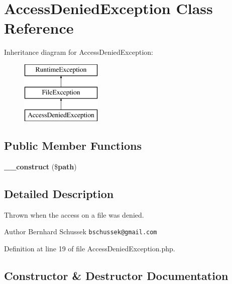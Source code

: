 \section{Access\+Denied\+Exception Class Reference}
\label{class_symfony_1_1_component_1_1_http_foundation_1_1_file_1_1_exception_1_1_access_denied_exception}
Inheritance diagram for Access\+Denied\+Exception\+:\begin{figure}[H]
\begin{center}
\leavevmode
\includegraphics[height=3.000000cm]{class_symfony_1_1_component_1_1_http_foundation_1_1_file_1_1_exception_1_1_access_denied_exception}
\end{center}
\end{figure}
\subsection*{Public Member Functions}
\begin{DoxyCompactItemize}
\item 
{\bf \+\_\+\+\_\+construct} (\${\bf path})
\end{DoxyCompactItemize}


\subsection{Detailed Description}
Thrown when the access on a file was denied.

\begin{DoxyAuthor}{Author}
Bernhard Schussek {\tt bschussek@gmail.\+com} 
\end{DoxyAuthor}


Definition at line 19 of file Access\+Denied\+Exception.\+php.



\subsection{Constructor \& Destructor Documentation}
